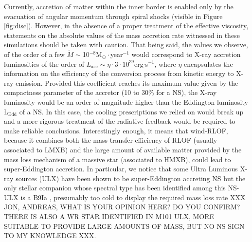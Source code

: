 \documentclass{aa}
\makeatletter
\newcommand*{\ns}{NS\@\xspace}
\makeatother
\begin{document}
Currently, accretion of matter within the inner border is enabled only by the evacuation of angular momentum through spiral shocks (visible in Figure\,\ref{fig:disc}). However, in the absence of a proper treatment of the effective viscosity, statements on the absolute values of the mass accretion rate witnessed in these simulations should be taken with caution. That being said, the values we observe, of the order of a few $\dot{M}\sim$10$^{-8}$M$_{\odot}\cdot$year$^{-1}$ would correspond to X-ray accretion luminosities of the order of $L_{\text{acc}}\sim\eta\cdot3\cdot10^{39}$erg$\cdot$s$^{-1}$, where $\eta$ encapsulates the information on the efficiency of the conversion process from kinetic energy to X-ray emission. Provided this coefficient reaches its maximum value given by the compactness parameter of the accretor (10 to 30\% for a \ns), the X-ray luminosity would be an order of magnitude higher than the Eddington luminosity L$_{\text{Edd}}$ of a \ns. In this case, the cooling prescriptions we relied on would break up and a more rigorous treatment of the radiative feedback would be required to make reliable conclusions. Interestingly enough, it means that wind-RLOF, because it combines both the mass transfer efficiency of RLOF (usually associated to LMXB) and the large amount of available matter provided by the mass loss mechanism of a massive star (associated to HMXB), could lead to super-Eddington accretion. In particular, we notice that some Ultra Luminous X-ray sources (ULX) have been shown to be super-Eddington accreting \ns \citep{Bachetti2014,Furst2016,Israel2017} but the only stellar companion whose spectral type has been identified among this \ns-ULX is a B9Ia \citep{Motch2011}, presumably too cold to display the required mass loss rate XXX JON, ANDREAS, WHAT IS YOUR OPINION HERE? DO YOU CONFIRM? THERE IS ALSO A WR STAR IDENTIFIED IN M101 ULX, MORE SUITABLE TO PROVIDE LARGE AMOUNTS OF MASS, BUT NO NS SIGN TO MY KNOWLEDGE XXX. 
\end{document}
